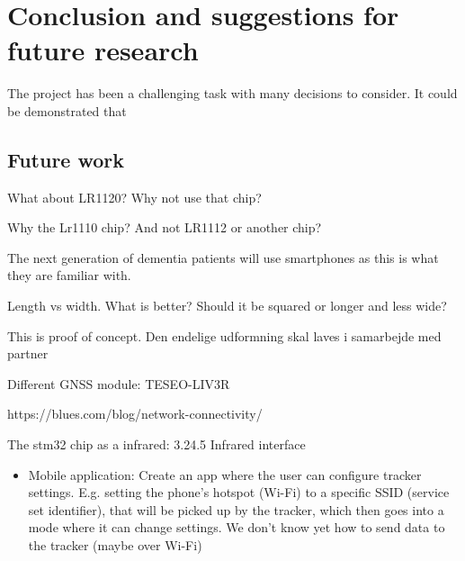 \section{Conclusion and suggestions for future research} \label{sec:conclusion}

The project has been a challenging task with many decisions to consider. It could be demonstrated that


\subsection{Future work}

What about LR1120? Why not use that chip?


Why the Lr1110 chip? And not LR1112 or another chip?


The next generation of dementia patients will use smartphones as this is what they are familiar with.

Length vs width. What is better? Should it be squared or longer and less wide?

This is proof of concept. Den endelige udformning skal laves i samarbejde med partner

Different GNSS module: TESEO-LIV3R

https://blues.com/blog/network-connectivity/


The stm32 chip as a infrared: 3.24.5 Infrared interface


\begin{itemize}
  \item Mobile application: Create an app where the user can configure tracker settings. E.g. setting the phone's hotspot (Wi-Fi) to a specific \ac{SSID} (service set identifier), that will be picked up by the tracker, which then goes into a mode where it can change settings. We don't know yet how to send data to the tracker (maybe over Wi-Fi)
\end{itemize}